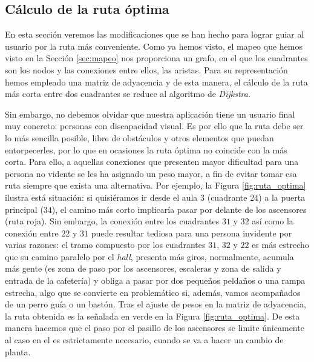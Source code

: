 \subsection{Cálculo de la ruta óptima}
\label{sub:rutaOptima}

En esta sección veremos las modificaciones que se han hecho para lograr guiar al usuario por la ruta más conveniente. Como ya hemos visto, el mapeo que hemos visto en la Sección \ref{sec:mapeo} nos proporciona un grafo, en el que los cuadrantes son los nodos y las conexiones entre ellos, las aristas. Para su representación hemos empleado una matriz de adyacencia y de esta manera, el cálculo de la ruta más corta entre dos cuadrantes se reduce al algoritmo de \textit{Dijkstra}.

Sin embargo, no debemos olvidar que nuestra aplicación tiene un usuario final muy concreto: personas con discapacidad visual. Es por ello que la ruta debe ser lo más sencilla posible, libre de obstáculos y otros elementos que puedan entorpecerles, por lo que en ocasiones la ruta óptima no coincide con la más corta. Para ello, a aquellas conexiones que presenten mayor dificultad para una persona no vidente se les ha asignado un peso mayor, a fin de evitar tomar esa ruta siempre que exista una alternativa. Por ejemplo, la Figura \ref{fig:ruta_optima} ilustra está situación: si quisiéramos ir desde el aula 3 (cuadrante $24$) a la puerta principal ($34$), el camino más corto implicaría pasar por delante de los ascensores (ruta roja). Sin embargo, la conexión entre los cuadrantes $31$ y $32$ así como la conexión entre $22$ y $31$ puede resultar tediosa para una persona invidente por varias razones: el tramo compuesto por los cuadrantes $31$, $32$ y $22$ es más estrecho que su camino paralelo por el \textit{hall}, presenta más giros, normalmente, acumula más gente (es zona de paso por los ascensores, escaleras y zona de salida y entrada de la cafetería) y obliga a pasar por dos pequeños peldaños o una rampa estrecha, algo que se convierte en problemático si, además, vamos acompañados de un perro guía o un bastón. Tras el ajuste de pesos en la matriz de adyacencia, la ruta obtenida es la señalada en verde en la Figura \ref{fig:ruta_optima}. De esta manera hacemos que el paso por el pasillo de los ascensores se limite únicamente al caso en el es estrictamente necesario, cuando se va a hacer un cambio de planta.


